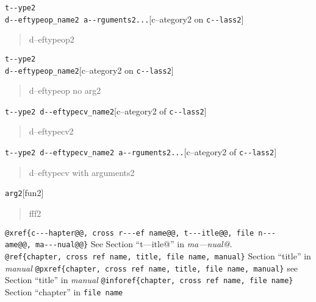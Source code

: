 \documentclass{book}
\begin{document}
\noindent\texttt{t{-}{-}ype2\leavevmode{}\\d{-}{-}eftypeop\_name2 a{-}{-}rguments2...}\hfill[c--ategory2 on \texttt{c{-}{-}lass2}]



%
\begin{quote}
\unskip{\parskip=0pt\noindent}%
d--eftypeop2
\end{quote}

\noindent\texttt{t{-}{-}ype2\leavevmode{}\\d{-}{-}eftypeop\_name2}\hfill[c--ategory2 on \texttt{c{-}{-}lass2}]



%
\begin{quote}
\unskip{\parskip=0pt\noindent}%
d--eftypeop no arg2
\end{quote}

\noindent\texttt{t{-}{-}ype2 d{-}{-}eftypecv\_name2}\hfill[c--ategory2 of \texttt{c{-}{-}lass2}]



%
\begin{quote}
\unskip{\parskip=0pt\noindent}%
d--eftypecv2
\end{quote}

\noindent\texttt{t{-}{-}ype2 d{-}{-}eftypecv\_name2 a{-}{-}rguments2...}\hfill[c--ategory2 of \texttt{c{-}{-}lass2}]



%
\begin{quote}
\unskip{\parskip=0pt\noindent}%
d--eftypecv with arguments2
\end{quote}

\noindent\texttt{arg2}\hfill[fun2]



%
\begin{quote}
\unskip{\parskip=0pt\noindent}%
fff2
\end{quote}


\texttt{@xref\{c{-}{-}{-}hapter@@,\ cross r{-}{-}{-}ef name@@,\ t{-}{-}{-}itle@@,\ file n{-}{-}{-}ame@@,\ ma{-}{-}{-}nual@@\}} See Section ``t---itle@'' in \textsl{ma---nual@}.
\texttt{@ref\{chapter,\ cross ref name,\ title,\ file name,\ manual\}} Section ``title'' in \textsl{manual}
\texttt{@pxref\{chapter,\ cross ref name,\ title,\ file name,\ manual\}} see Section ``title'' in \textsl{manual}
\texttt{@inforef\{chapter,\ cross ref name,\ file name\}} Section ``chapter'' in \texttt{file name}
\end{document}
